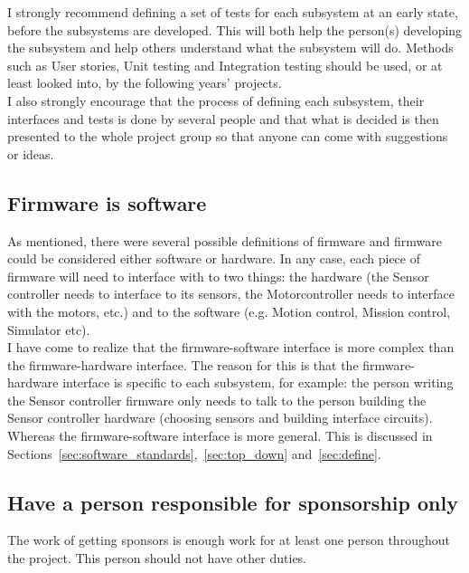 I strongly recommend defining a set of tests for each subsystem at an early state, before the subsystems are developed.
This will both help the person(s) developing the subsystem and help others understand what the subsystem will do. 
Methods such as User stories, Unit testing and Integration testing should be used, or at least looked into, by the following years' projects.\\
I also strongly encourage that the process of defining each subsystem, their interfaces and tests is done by several people and that what is decided is then presented to the whole project group so that anyone can come with suggestions or ideas.


\subsection{Firmware is software}\label{sec:firmware}
As mentioned, there were several possible definitions of firmware and firmware could be considered either software or hardware. %
In any case, each piece of firmware will need to interface with to two things: the hardware (the Sensor controller needs to interface to its sensors, the Motorcontroller needs to interface with the motors, etc.) and to the software (e.g. Motion control, Mission control, Simulator etc). \\
I have come to realize that the firmware-software interface is more complex than the firmware-hardware interface. The reason for this is that the firmware-hardware interface is specific to each subsystem, for example: the person writing the Sensor controller firmware only needs to talk to the person building the Sensor controller hardware (choosing sensors and building interface circuits). Whereas the firmware-software interface is more general. This is discussed in Sections~\ref{sec:software_standards},~\ref{sec:top_down} and~\ref{sec:define}.


\subsection{Have a person responsible for sponsorship only}
The work of getting sponsors is enough work for at least one person throughout the project. This person should not have other duties.

